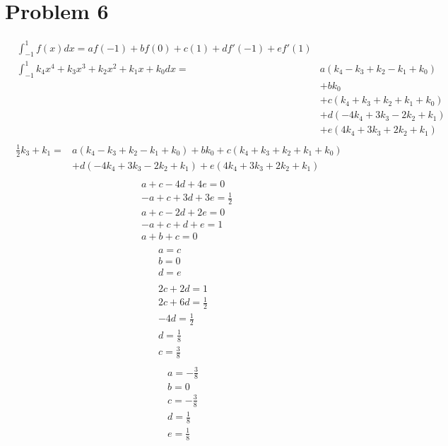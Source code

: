 \documentclass[11pt,fleqn]{article} %
\begin{document}
\section*{Problem 6}
\begin{align*}
&\int_{-1}^1 f(x) dx = af(-1)+bf(0)+c(1)+df'(-1)+ef'(1) \\
&\int_{-1}^1 k_4x^4 + k_3x^3 + k_2x^2 + k_1x + k_0 dx =& a(k_4 - k_3 + k_2 - k_1 + k_0)\\ &&+bk_0 \\&&+c(k_4+k_3+k_2+k_1+k_0)\\& &+d(-4k_4+3k_3-2k_2+k_1)\\ &&+e(4k_4+3k_3+2k_2+k_1)\\
\end{align*}
\begin{align*}
\frac{1}{2}k_3+k_1 =& a(k_4 - k_3 + k_2 - k_1 + k_0) +bk_0+c(k_4+k_3+k_2+k_1+k_0)\\ &+d(-4k_4+3k_3-2k_2+k_1)+e(4k_4+3k_3+2k_2+k_1)&\\ 
\end{align*}
\begin{align*}
&a+c-4d+4e = 0 \\
&-a+c+3d+3e = \frac{1}{2} \\
&a+c-2d+2e = 0 \\
&-a+c+d+e = 1 \\
&a+b+c = 0 \\
\end{align*}
\begin{align*}
a = c\\
b = 0\\
d = e\\
\\
2c+2d = 1 \\
2c+6d=\frac{1}{2}\\
-4d = \frac{1}{2}\\
d = \frac{1}{8}\\ c = \frac{3}{8}\\
\end{align*}
\begin{align*}
a = -\frac{3}{8}\\
b = 0\\
c = -\frac{3}{8}\\
d = \frac{1}{8}\\
e = \frac{1}{8}\\
\end{align*}
\end{document}
